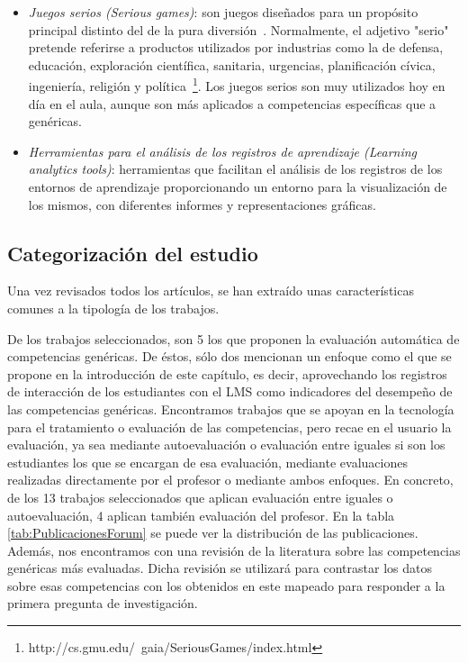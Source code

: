 \begin{itemize}
\item \emph{Juegos serios (Serious games)}: son juegos diseñados para un propósito principal distinto del de la pura diversión~\cite{djaouti2011classifying}. Normalmente, el adjetivo "serio" pretende referirse a productos utilizados por industrias como la de defensa, educación, exploración científica, sanitaria, urgencias, planificación cívica, ingeniería, religión y política~\footnote{http://cs.gmu.edu/~gaia/SeriousGames/index.html}. Los juegos serios son muy utilizados hoy en día en el aula, aunque son más aplicados a competencias específicas que a genéricas. 
\item \emph{Herramientas para el análisis de los registros de aprendizaje (Learning analytics tools)}: herramientas que facilitan el análisis de los registros de los entornos de aprendizaje proporcionando un entorno para la visualización de los mismos, con diferentes informes y representaciones gráficas.
\end{itemize}



\subsection{Categorización del estudio}

Una vez revisados todos los artículos, se han extraído unas características comunes a la tipología de los trabajos. 

De los trabajos seleccionados, son 5 los que proponen la evaluación automática de competencias genéricas. De éstos, sólo dos mencionan un enfoque como el que se propone en la introducción de este capítulo, es decir, aprovechando los registros de interacción de los estudiantes con el LMS como indicadores del desempeño de las competencias genéricas. Encontramos trabajos que se apoyan en la tecnología para el tratamiento o evaluación de las competencias, pero recae en el usuario la evaluación, ya sea mediante autoevaluación o evaluación entre iguales si son los estudiantes los que se encargan de esa evaluación, mediante evaluaciones realizadas directamente por el profesor o mediante ambos enfoques. En concreto, de los 13 trabajos seleccionados que aplican evaluación entre iguales o autoevaluación, 4 aplican también evaluación del profesor. En la tabla \ref{tab:PublicacionesForum} se puede ver la distribución de las publicaciones. Además, nos encontramos con una revisión de la literatura sobre las competencias genéricas más evaluadas. Dicha revisión se utilizará para contrastar los datos sobre esas competencias con los obtenidos en este mapeado para responder a la primera pregunta de investigación. %

